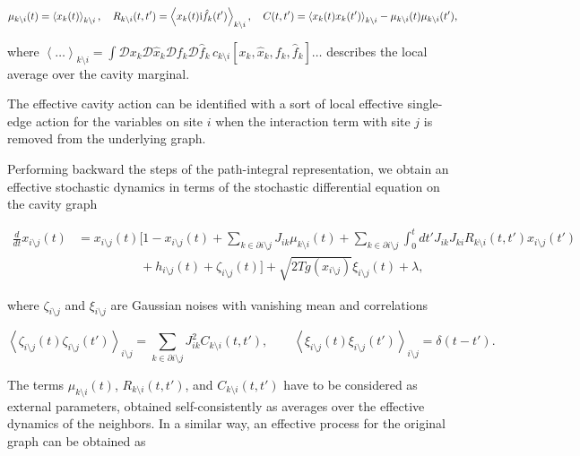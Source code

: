 \documentclass[
    preprint,
    linenumbers,
    amsmath,amssymb,amsfonts,
    aps, physrev,
    superscriptaddress,
    10pt,
    bibnotes
    ]{revtex4-2}
\begin{document}
\begin{equation}
\mu_{k\setminus i}(t)=\left\langle x_{k}(t)\right\rangle _{k\setminus i},\quad R_{k\setminus i}(t,t')=\left\langle x_{k}(t){\rm i}\hat{f}_{k}(t')\right\rangle _{k\setminus i},\quad C(t,t')=\left\langle x_{k}(t)x_{k}(t')\right\rangle _{k\setminus i} - \mu_{k\setminus i}(t)\mu_{k\setminus i}(t'),
\end{equation}

where $\left\langle \dots\right\rangle _{k\setminus i}=\int{\mathcal{D}x_k\mathcal{D}\hat{x}_k\mathcal{D}f_k\mathcal{D}\hat{f}_k} \, c_{k\setminus i}[x_{k},\hat{x}_{k}, f_k, \hat{f}_k] \dots$
describes the local average over the cavity marginal.

The effective cavity action can be identified with a sort of local effective single-edge action for the variables on site $i$ when the interaction term with site $j$ is removed from the underlying graph.

Performing backward the steps of the path-integral representation, we obtain an effective stochastic dynamics in terms of the stochastic differential equation on the cavity graph

\begin{align}
  \frac{d}{dt}x_{i\setminus j}(t) & =x_{i\setminus j}(t)\Biggl[1-x_{i\setminus j}(t)+\sum_{k\in\partial i\setminus j}J_{ik}\mu_{k\setminus i}(t) + \sum_{k\in\partial i\setminus j}\int_{0}^{t}dt'J_{ik}J_{ki}R_{k\setminus i}(t,t')x_{i\setminus j}(t') \nonumber \\
  & \qquad\quad \qquad + h_{i\setminus j}(t)+\zeta_{i\setminus j}(t)\Biggr]+\sqrt{2Tg(x_{i\setminus j})}\xi_{i\setminus j}(t)+\lambda,
\end{align}

where $\zeta_{i\setminus j}$ and $\xi_{i\setminus j}$ are Gaussian noises with vanishing mean and correlations

\begin{equation}
  \left\langle \zeta_{i\setminus j}(t)\zeta_{i\setminus j}(t')\right\rangle _{i\setminus j}=\sum_{k\in\partial i\setminus j}J_{ik}^{2}C_{k\setminus i}(t,t'),\qquad\left\langle \xi_{i\setminus j}(t)\xi_{i\setminus j}(t')\right\rangle _{i\setminus j}=\delta(t-t').
\end{equation}

The terms $\mu_{k\setminus i}(t)$, $R_{k\setminus i}(t,t')$, and $C_{k\setminus i}(t,t')$ have to be considered as external parameters, obtained self-consistently as averages over the effective dynamics of the neighbors. In a similar way, an effective process for the original graph can be obtained as
\end{document}
